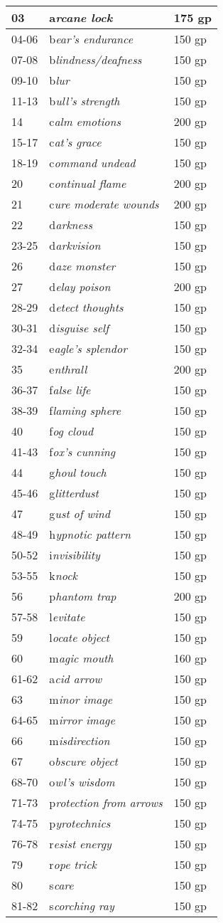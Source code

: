 \documentclass{article}
\begin{document}
\begin{tabular}{|>{\raggedright}p{28pt}|>{\raggedright}p{200pt}|>{\raggedright}p{85pt}|}
03 & a\textit{rcane lock} & 175 gp\tabularnewline
\hline
04-06 & b\textit{ear's endurance} & 150 gp\tabularnewline
\hline
07-08 & b\textit{lindness/deafness} & 150 gp\tabularnewline
\hline
09-10 & b\textit{lur} & 150 gp\tabularnewline
\hline
11-13 & b\textit{ull's strength} & 150 gp\tabularnewline
\hline
14 & c\textit{alm emotions} & 200 gp\tabularnewline
\hline
15-17 & c\textit{at's grace} & 150 gp\tabularnewline
\hline
18-19 & c\textit{ommand undead} & 150 gp\tabularnewline
\hline
20 & c\textit{ontinual flame} & 200 gp\tabularnewline
\hline
21 & c\textit{ure moderate wounds} & 200 gp\tabularnewline
\hline
22 & d\textit{arkness} & 150 gp\tabularnewline
\hline
23-25 & d\textit{arkvision} & 150 gp\tabularnewline
\hline
26 & d\textit{aze monster} & 150 gp\tabularnewline
\hline
27 & d\textit{elay poison} & 200 gp\tabularnewline
\hline
28-29 & d\textit{etect thoughts} & 150 gp\tabularnewline
\hline
30-31 & d\textit{isguise self} & 150 gp\tabularnewline
\hline
32-34 & e\textit{agle's splendor} & 150 gp\tabularnewline
\hline
35 & e\textit{nthrall} & 200 gp\tabularnewline
\hline
36-37 & f\textit{alse life} & 150 gp\tabularnewline
\hline
38-39 & f\textit{laming sphere} & 150 gp\tabularnewline
\hline
40 & f\textit{og cloud} & 150 gp\tabularnewline
\hline
41-43 & f\textit{ox's cunning} & 150 gp\tabularnewline
\hline
44 & g\textit{houl touch} & 150 gp\tabularnewline
\hline
45-46 & g\textit{litterdust} & 150 gp\tabularnewline
\hline
47 & g\textit{ust of wind} & 150 gp\tabularnewline
\hline
48-49 & h\textit{ypnotic pattern} & 150 gp\tabularnewline
\hline
50-52 & i\textit{nvisibility} & 150 gp\tabularnewline
\hline
53-55 & k\textit{nock} & 150 gp\tabularnewline
\hline
56 & p\textit{hantom trap} & 200 gp\tabularnewline
\hline
57-58 & l\textit{evitate} & 150 gp\tabularnewline
\hline
59 & l\textit{ocate object} & 150 gp\tabularnewline
\hline
60 & m\textit{agic mouth} & 160 gp\tabularnewline
\hline
61-62 & a\textit{cid arrow} & 150 gp\tabularnewline
\hline
63 & m\textit{inor image} & 150 gp\tabularnewline
\hline
64-65 & m\textit{irror image} & 150 gp\tabularnewline
\hline
66 & m\textit{isdirection} & 150 gp\tabularnewline
\hline
67 & o\textit{bscure object} & 150 gp\tabularnewline
\hline
68-70 & o\textit{wl's wisdom} & 150 gp\tabularnewline
\hline
71-73 & p\textit{rotection from arrows} & 150 gp\tabularnewline
\hline
74-75 & p\textit{yrotechnics} & 150 gp\tabularnewline
\hline
76-78 & r\textit{esist energy} & 150 gp\tabularnewline
\hline
79 & r\textit{ope trick} & 150 gp\tabularnewline
\hline
80 & s\textit{care} & 150 gp\tabularnewline
\hline
81-82 & s\textit{corching ray} & 150 gp\tabularnewline

\end{tabular}
\end{document}
